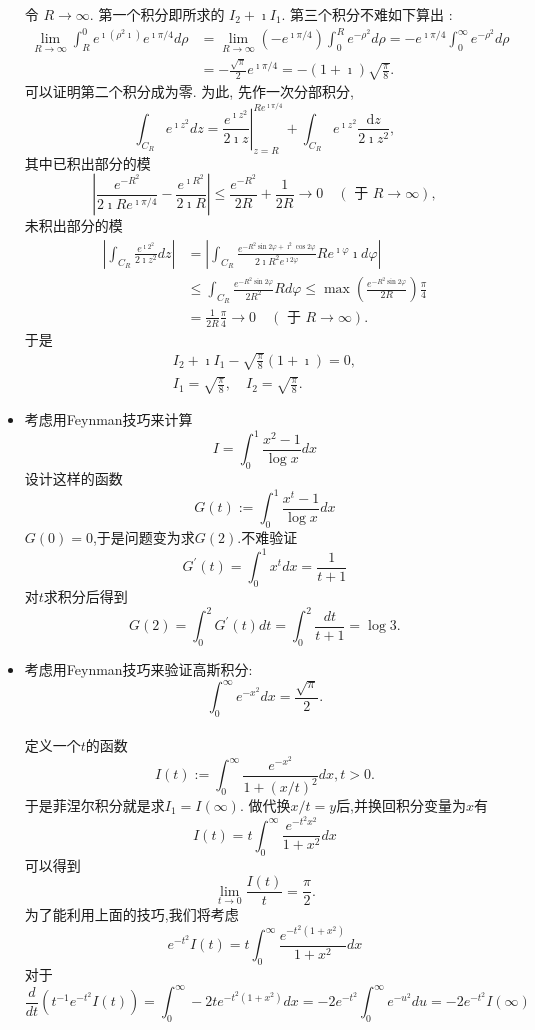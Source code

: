 \begin{itemize}
令 $R \rightarrow \infty$. 第一个积分即所求的 $I_2+\imath I_1$. 第三个积分不难如下算出 :
$$
\begin{aligned}
\lim _{R \rightarrow \infty} \int_R^0 e^{\imath\left(\rho^2 \imath\right)} e^{\imath \pi / 4} d \rho & =\lim _{R \rightarrow \infty}\left(-e^{\imath \pi / 4}\right) \int_0^R e^{-\rho^2} d \rho=-e^{\imath \pi / 4} \int_0^{\infty} e^{-\rho^2} d \rho \\
& =-\frac{\sqrt{\pi}}{2} e^{\imath \pi / 4}=-(1+\imath) \sqrt{\frac{\pi}{8}} .
\end{aligned}
$$
可以证明第二个积分成为零. 为此, 先作一次分部积分,
$$
\int_{C_R} e^{\imath z^2} d z=\left.\frac{e^{\imath z^2}}{2 \imath z}\right|_{z=R} ^{R e^{\imath \pi / 4}}+\int_{C_R} e^{\imath z^2} \frac{\mathrm{d} z}{2 \imath z^2},
$$
其中已积出部分的模
$$
\left|\frac{e^{-R^2}}{2 \imath R e^{\imath \pi / 4}}-\frac{e^{\imath R^2}}{2 \imath R}\right| \leqslant \frac{e^{-R^2}}{2 R}+\frac{1}{2 R} \rightarrow 0 \quad(\text { 于 } R \rightarrow \infty),
$$
未积出部分的模
$$
\begin{aligned}
\left|\int_{C_R} \frac{e^{\imath 2^2}}{2 \imath {z}^2} d z\right| & =\left|\int_{C_R} \frac{e^{-R^2 \sin 2 \varphi+\imath^2 \cos 2 \varphi}}{2 \imath R^2 e^{\imath 2 \varphi}} R e^{\imath \varphi} \imath d \varphi\right| \\
& \leqslant \int_{C_R} \frac{e^{-R^2 \sin 2 \varphi}}{2 R^2} R d \varphi \leqslant \max \left(\frac{e^{-R^2 \sin 2 \varphi}}{2 R}\right) \frac{\pi}{4}
\\
&=\frac{1}{2 R} \frac{\pi}{4} \rightarrow 0 \quad(\text { 于 } R \rightarrow \infty) .
\end{aligned}
$$
于是
$$
\begin{gathered}
I_2+\imath I_1-\sqrt{\frac{\pi}{8}}(1+\imath)=0, \\
I_1=\sqrt{\frac{\pi}{8}}, \quad I_2=\sqrt{\frac{\pi}{8}} .
\end{gathered}
$$
\item 考虑用Feynman技巧来计算
$$
I = \int_0^1 \frac{x^2-1}{\log x} d x
$$
设计这样的函数
$$
G(t):=\int_0^1 \frac{x^t-1}{\log x} d x
$$
$G(0) = 0$,于是问题变为求$G(2)$.不难验证
$$
G^{\prime}(t)=\int_0^1 x^t d x=\frac{1}{t+1}
$$
对$t$求积分后得到
$$
G(2)=\int_0^2 G^{\prime}(t) d t=\int_0^2 \frac{d t}{t+1}=\log 3.
$$

\item 考虑用Feynman技巧来验证高斯积分:
$$
\int_0^{\infty} e^{-x^2} d x = \frac{\sqrt{\pi}}{2}.
$$
\\
定义一个$t$的函数
$$
I(t):=\int_0^{\infty} \frac{e^{-x^2}}{1+(x / t)^2} d x, t>0. 
$$
于是菲涅尔积分就是求$I_1 = I(\infty)$.
做代换$x/t=y$后,并换回积分变量为$x$有 $$
I(t)=t \int_0^{\infty} \frac{e^{-t^2 x^2}}{1+x^2} d x
$$
可以得到 $$
\lim _{t \rightarrow 0} \frac{I(t)}{t}=\frac{\pi}{2}.
$$
为了能利用上面的技巧,我们将考虑
$$
e^{-t^2} I(t)=t \int_0^{\infty} \frac{e^{-t^2\left(1+x^2\right)}}{1+x^2} d x
$$
对于
$$
\frac{d}{d t}\left(t^{-1} e^{-t^2} I(t)\right)=\int_0^{\infty}-2 t e^{-t^2\left(1+x^2\right)} d x=-2 e^{-t^2} \int_0^{\infty} e^{-u^2} d u=-2 e^{-t^2} I(\infty)
$$


\end{itemize}
